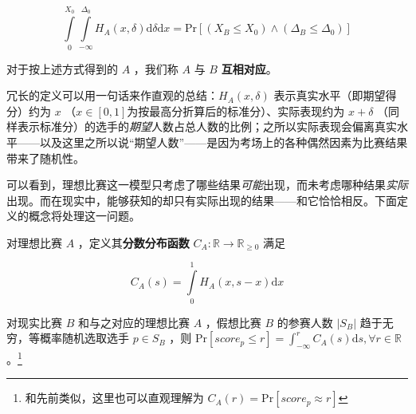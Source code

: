 \begin{definition}
\begin{asparaenum}[\bfseries{步骤} 1.]
                    $$
                    \int\limits_0^{X_0}\int\limits_{-\infty}^{\Delta_0} H_A(x,\delta)\mathrm{d}\delta\mathrm{d}x=\mathrm{Pr}\left[\left(X_B\leq X_0\right)\land\left(\Delta_B\leq\Delta_0\right)\right]
                    $$

                \end{asparaenum}

                对于按上述方式得到的 $A$ ，我们称 $A$ 与 $B$ \textbf{互相对应}。
                \label{def:realIdealCorrespondence}
            \end{definition}

            冗长的定义可以用一句话来作直观的总结：$H_A\left(x,\delta\right)$ 表示真实水平（即期望得分）约为 $x$ （$x\in\left[0,1\right]$为按最高分折算后的标准分）、实际表现约为 $x+\delta$ （同样表示标准分）的选手的\emph{期望}人数占总人数的比例；之所以实际表现会偏离真实水平——以及这里之所以说“期望人数”——是因为考场上的各种偶然因素为比赛结果带来了随机性。

            可以看到，理想比赛这一模型只考虑了哪些结果\emph{可能}出现，而未考虑哪种结果\emph{实际}出现。而在现实中，能够获知的却只有实际出现的结果——和它恰恰相反。下面定义的概念将处理这一问题。

            \begin{definition}[分数分布函数]
                对理想比赛 $A$ ，定义其\textbf{分数分布函数} $C_A:\mathbb{R}\to\mathbb{R}_{\geq 0}$ 满足

                $$
                C_A(s)=\int\limits_{0}^1 H_A(x,s-x) \mathrm{d}x
                $$

                \label{def:scoreDistribution}
            \end{definition}

            \begin{proposition}[分数分布函数的实际含义]
                对现实比赛 $B$ 和与之对应的理想比赛 $A$ ，假想比赛 $B$ 的参赛人数 $|S_B|$ 趋于无穷，等概率随机选取选手 $p\in S_B$ ，则 $\mathrm{Pr}\left[\textit{score}_p\leq r\right]=\int_{-\infty}^r C_A(s)\mathrm{d}s,\forall r\in\mathbb{R}$ 。\footnote{和先前类似，这里也可以直观理解为 $C_A(r)=\mathrm{Pr}\left[\textit{score}_p\approx r\right]$ }
                \label{prop:scoreDistributionMeaning}
            \end{proposition}

